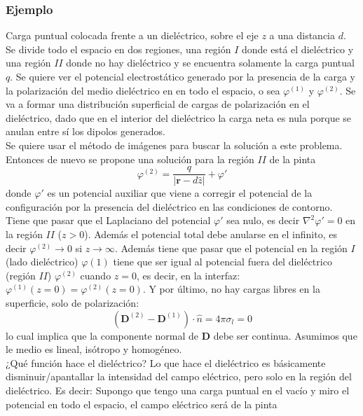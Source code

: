 

\subsubsection{Ejemplo}
Carga puntual colocada frente a un dieléctrico, sobre el eje $z$ a una distancia $d$. Se divide todo el espacio en dos regiones, una región $I$ donde está el dieléctrico y una región $II$ donde no hay dieléctrico y se encuentra solamente la carga puntual $q$. Se quiere ver el potencial electrostático generado por la presencia de la carga y la polarización del medio dieléctrico en en todo el espacio, o sea $\varphi^{(1)}$ y $\varphi^{(2)}$. Se va a formar una distribución superficial de cargas de polarización en el dieléctrico, dado que en el interior del dieléctrico la carga neta es nula porque se anulan entre sí los dipolos generados.\\
\indent Se quiere usar el método de imágenes para buscar la solución a este problema. Entonces de nuevo se propone una solución para la región $II$ de la pinta
\begin{equation*}
    \varphi^{(2)} = \frac{q}{|\textbf{r}-d\hat{z}|} + \varphi'
\end{equation*}
donde $\varphi'$ es un potencial auxiliar que viene a corregir el potencial de la configuración por la presencia del dieléctrico en las condiciones de contorno.\\
\indent Tiene que pasar que el Laplaciano del potencial $\varphi'$ sea nulo, es decir $\nabla^{2}\varphi' = 0$ en la región $II$ ($z > 0$). Además el potencial total debe anularse en el infinito, es decir $\varphi^{(2)} \to 0$ si $z \to \infty$. Además tiene que pasar que el potencial en la región $I$ (lado dieléctrico) $\varphi{(1)}$ tiene que ser igual al potencial fuera del dieléctrico (región $II$) $\varphi^{(2)}$ cuando $z = 0$, es decir, en la interfaz: $\varphi^{(1)}(z = 0) = \varphi^{(2)}(z = 0)$. Y por último, no hay cargas libres en la superficie, solo de polarización: 
\begin{equation*}
    \left(
        \textbf{D}^{(2)} - \textbf{D}^{(1)} 
    \right)\cdot \hat{n}
    = 4\pi \sigma_{l} = 0
\end{equation*}
lo cual implica que la componente normal de $\textbf{D}$ debe ser continua. Asumimos que le medio es lineal, isótropo y homogéneo.\\
\indent ¿Qué función hace el dieléctrico? Lo que hace el dieléctrico es básicamente disminuir/apantallar la intensidad del campo eléctrico, pero solo en la región del dieléctrico. Es decir: Supongo que tengo una carga puntual en el vacío y miro el potencial en todo el espacio, el campo eléctrico será de la pinta
